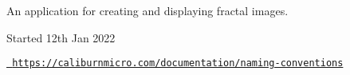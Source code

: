 An application for creating and displaying fractal images.

Started 12th Jan 2022

\href{https://caliburnmicro.com/documentation/naming-conventions}{\texttt{ https\+://caliburnmicro.\+com/documentation/naming-\/conventions}} 